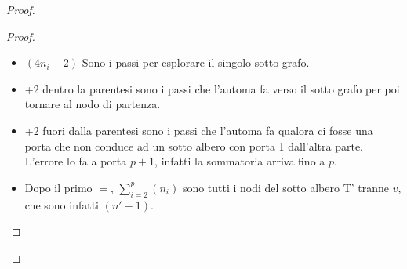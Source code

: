 \begin{proof}
\begin{proof}
\begin{itemize}
    \item $(4 n_i - 2)$ Sono i passi per esplorare il singolo sotto grafo.
    \item +2 dentro la parentesi sono i passi che l'automa fa verso il sotto grafo per poi tornare al nodo di partenza.
    \item +2 fuori dalla parentesi sono i passi che l'automa fa qualora ci fosse una porta che non conduce ad un sotto albero con porta 1 dall'altra parte. L'errore lo fa a porta $p+1$, infatti la sommatoria arriva fino a $p$.
    \item Dopo il primo $=$, $\sum_{i=2}^{p} (n_i)$ sono tutti i nodi del sotto albero T' tranne $v$, che sono infatti $(n'-1)$.
\end{itemize}

\end{proof}
\end{proof}
